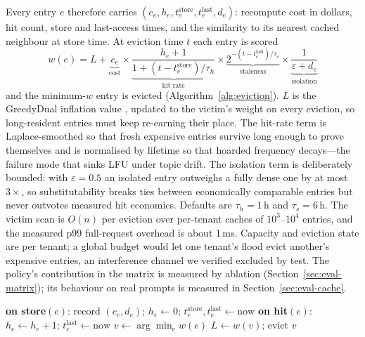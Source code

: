 Every entry $e$ therefore carries $(c_e, h_e, t^{\mathrm{store}}_e,
t^{\mathrm{last}}_e, d_e)$: recompute cost in dollars, hit count, store and
last-access times, and the similarity to its nearest cached neighbour at
store time. At eviction time $t$ each entry is scored
\begin{equation}
  w(e) = L + \underbrace{c_e}_{\text{cost}}
  \times \underbrace{\frac{h_e + 1}{1 + (t - t^{\mathrm{store}}_e)/\tau_h}}_{\text{hit rate}}
  \times \underbrace{2^{-(t - t^{\mathrm{last}}_e)/\tau_s}}_{\text{staleness}}
  \times \underbrace{\frac{1}{\varepsilon + d_e}}_{\text{isolation}}
  \label{eq:eviction-weight}
\end{equation}
and the minimum-$w$ entry is evicted (Algorithm~\ref{alg:eviction}). $L$
is the GreedyDual inflation value \citep{cao1997greedydual}, updated to the
victim's weight on every eviction, so long-resident entries must keep
re-earning their place. The hit-rate term is Laplace-smoothed so that
fresh expensive entries survive long enough to prove themselves and is
normalised by lifetime so that hoarded frequency decays---the failure mode
that sinks LFU under topic drift. The isolation term is deliberately
bounded: with $\varepsilon = 0.5$ an isolated entry outweighs a fully dense
one by at most $3\times$, so substitutability breaks ties between
economically comparable entries but never outvotes measured hit economics.
Defaults are $\tau_h = 1$\,h and $\tau_s = 6$\,h. The victim scan is $O(n)$
per eviction over per-tenant caches of $10^3$--$10^4$ entries, and the
measured p99 full-request overhead is about 1\,ms. Capacity and eviction
state are per tenant; a global budget would let one tenant's flood evict
another's expensive entries, an interference channel we verified excluded
by test. The policy's contribution in the matrix is measured by ablation
(Section~\ref{sec:eval-matrix}); its behaviour on real prompts is measured
in Section~\ref{sec:eval-cache}.

\begin{algorithm}[htbp]
\caption{Cost-aware eviction (per tenant)}
\label{alg:eviction}
\begin{algorithmic}[1]
\State \textbf{on store}$(e)$: record $(c_e, d_e)$;
  $h_e \gets 0$; $t^{\mathrm{store}}_e, t^{\mathrm{last}}_e \gets \text{now}$
\State \textbf{on hit}$(e)$: $h_e \gets h_e + 1$;
  $t^{\mathrm{last}}_e \gets \text{now}$
  \State $v \gets \arg\min_{e} w(e)$
  \State $L \gets w(v)$; evict $v$
\EndWhile
\end{algorithmic}
\end{algorithm}

